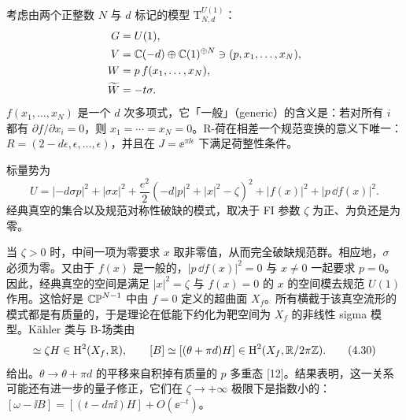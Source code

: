 

考虑由两个正整数 $N$ 与 $d$ 标记的模型 $\mathrm{T}^{U(1)}_{N,d}$：
\begin{align*}
    G &= U(1),\\
    V &= \mathbb{C}(-d)\oplus\mathbb{C}(1)^{\oplus N}\ni(p,x_1,\ldots,x_N),\\
    W &= p\,f(x_1,\ldots,x_N),\\
    \widetilde{W} &= -t\sigma.
\end{align*}
$f(x_1,\ldots,x_N)$ 是一个 $d$ 次多项式，它「一般」（generic）的含义是：若对所有 $i$ 都有 $\partial f/\partial x_i=0$，则 $x_1=\cdots=x_N=0$。R-荷在相差一个规范变换的意义下唯一：$R=(2-d\epsilon,\epsilon,\ldots,\epsilon)$，并且在 $J=\ee^{\pi\ii\epsilon}$ 下满足荷整性条件。

标量势为
\begin{equation}
    U = |-d\sigma p|^2 + |\sigma x|^2 + \frac{e^2}{2}\left(-d|p|^2+|x|^2-\zeta\right)^2
    + |f(x)|^2 + |p\,\dd f(x)|^2. \tag{4.29}
\end{equation}
经典真空的集合以及规范对称性破缺的模式，取决于 FI 参数 $\zeta$ 为正、为负还是为零。

当 $\zeta>0$ 时，中间一项为零要求 $x$ 取非零值，从而完全破缺规范群。相应地，$\sigma$ 必须为零。又由于 $f(x)$ 是一般的，$|p\,\dd f(x)|^2=0$ 与 $x\neq0$ 一起要求 $p=0$。因此，经典真空的空间是满足 $|x|^2=\zeta$ 与 $f(x)=0$ 的 $x$ 的空间模去规范 $U(1)$ 作用。这恰好是 $\mathbb{CP}^{N-1}$ 中由 $f=0$ 定义的超曲面 $X_f$。所有横截于该真空流形的模式都是有质量的，于是理论在低能下约化为靶空间为 $X_f$ 的非线性 sigma 模型。Kähler 类与 B-场类由
\begin{equation}
    [\omega]\simeq\zeta H\in\mathrm{H}^2(X_f,\R),\qquad
    [B]\simeq[(\theta+\pi d)H]\in\mathrm{H}^2(X_f,\R/2\pi\Z). \tag{4.30}
\end{equation}
给出。$\theta\to\theta+\pi d$ 的平移来自积掉有质量的 $p$ 多重态 [12]。结果表明，这一关系可能还有进一步的量子修正，它们在 $\zeta\to+\infty$ 极限下是指数小的：$[\omega-\ii B]=[(t-d\pi\ii)H]+O(\ee^{-t})$。

